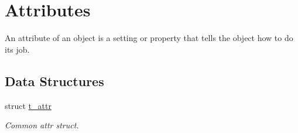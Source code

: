 \hypertarget{group__attr}{
\section{Attributes}
\label{group__attr}
}


An attribute of an object is a setting or property that tells the object how to do its job.  
\subsection*{Data Structures}
\begin{DoxyCompactItemize}
\item 
struct \hyperlink{structt__attr}{t\_\-attr}
\begin{DoxyCompactList}\small\item\em Common attr struct. \item\end{DoxyCompactList}\end{DoxyCompactItemize}
